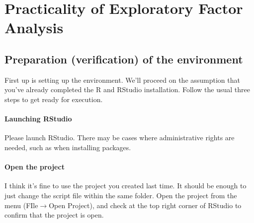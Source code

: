 \documentclass{ltjsbook}
\begin{document}
\section{Practicality of Exploratory Factor Analysis}
\subsection{Preparation (verification) of the environment}
First up is setting up the environment. We'll proceed on the assumption that you've already completed the R and RStudio installation. Follow the usual three steps to get ready for execution.
\paragraph{Launching RStudio} Please launch RStudio. There may be cases where administrative rights are needed, such as when installing packages.
\paragraph{Open the project} I think it's fine to use the project you created last time. It should be enough to just change the script file within the same folder. Open the project from the menu (FIle$\to$Open Project), and check at the top right corner of RStudio to confirm that the project is open.
\end{document}
